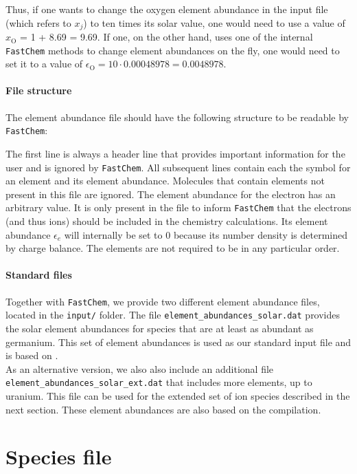 \documentclass[numbers=noenddot]{aux/fcmanual}
\newcommand{\fc}{\texttt{FastChem}\xspace}
\begin{document}
Thus, if one wants to change the oxygen element abundance in the input file (which refers to $x_j$) to ten times its solar value, one would need to use a value of $x_\mathrm{O}$ = 1 + 8.69 = 9.69. If one, on the other hand, uses one of the internal \fc methods to change element abundances on the fly, one would need to set it to a value of $\epsilon_\mathrm{O} = 10 \cdot 0.00048978 =  0.0048978$.

\newpage
\paragraph{File structure}
The element abundance file should have the following structure to be readable by \fc:


The first line is always a header line that provides important information for the user and is ignored by \fc. All subsequent lines contain each the symbol for an element and its element abundance. Molecules that contain elements not present in this file are ignored. The element abundance for  the electron has an arbitrary value. It is only present in the file to inform \fc that the electrons (and thus ions) should be included in the chemistry calculations. Its element abundance $\epsilon_e$ will internally be set to 0 because its number density is determined by charge balance. The elements are not required to be in any particular order. 


\paragraph{Standard files}
Together with \fc, we provide two different element abundance files, located in the \verb|input/| folder. The file \verb|element_abundances_solar.dat| provides the solar element abundances for species that are at least as abundant as germanium. This set of element abundances is used as our standard input file and is based on \citet{Asplund2009ARA&A..47..481A}.\\
As an alternative version, we also also include an additional file \verb|element_abundances_solar_ext.dat| that includes more elements, up to uranium. This file can be used for the extended set of ion species described in the next section. These element abundances are also based on the \citet{Asplund2009ARA&A..47..481A} compilation.


\section{Species file}
\end{document}
